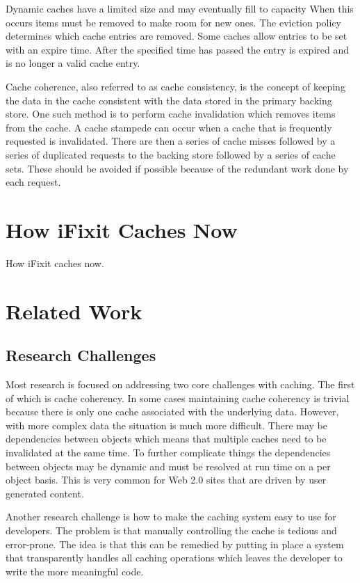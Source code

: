 \documentclass[12pt]{ucthesis}
\begin{document}
Dynamic caches have a limited size and may eventually fill to capacity
When this occurs items must be removed to make room for new ones.
The eviction policy determines which cache entries are removed.
Some caches allow entries to be set with an expire time.
After the specified time has passed the entry is expired and is no longer a valid cache entry.

Cache coherence, also referred to as cache consistency, is the concept of keeping the data in the cache consistent with the data stored in the primary backing store.
One such method is to perform cache invalidation which removes items from the cache.
A cache stampede can occur when a cache that is frequently requested is invalidated.
There are then a series of cache misses followed by a series of duplicated requests to the backing store followed by a series of cache sets.
These should be avoided if possible because of the redundant work done by each request.


\section{How iFixit Caches Now}
How iFixit caches now.

\section{Related Work}

\subsection{Research Challenges}
Most research is focused on addressing two core challenges with caching.
The first of which is cache coherency.
In some cases maintaining cache coherency is trivial because there is only one cache associated with the underlying data.
However, with more complex data the situation is much more difficult.
There may be dependencies between objects which means that multiple caches need to be invalidated at the same time.
To further complicate things the dependencies between objects may be dynamic and must be resolved at run time on a per object basis.
This is very common for Web 2.0 sites that are driven by user generated content.

Another research challenge is how to make the caching system easy to use for developers.
The problem is that manually controlling the cache is tedious and error-prone.
The idea is that this can be remedied by putting in place a system that transparently handles all caching operations which leaves the developer to write the more meaningful code.
\end{document}

